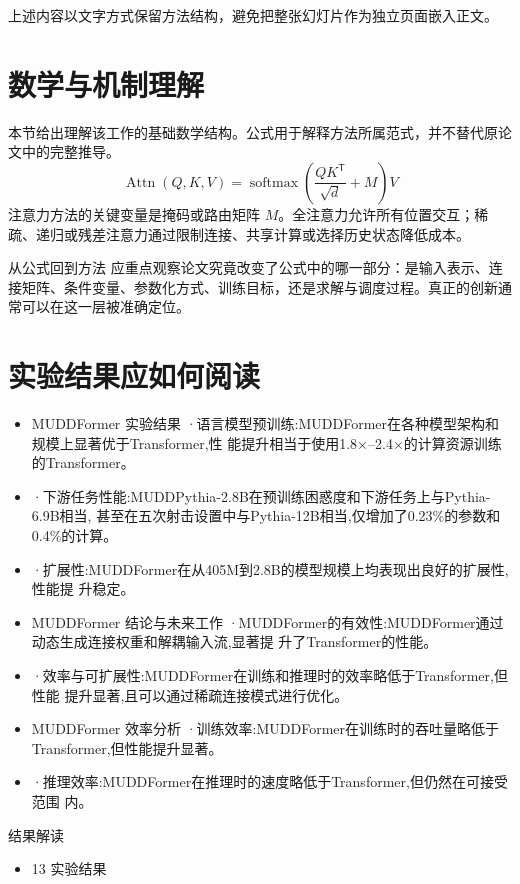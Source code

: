 \documentclass[UTF8,11pt,a4paper]{ctexart}
\begin{document}
上述内容以文字方式保留方法结构，避免把整张幻灯片作为独立页面嵌入正文。

\section{数学与机制理解}
本节给出理解该工作的基础数学结构。公式用于解释方法所属范式，并不替代原论文中的完整推导。
\begin{equation}
\operatorname{Attn}(Q,K,V)=\operatorname{softmax}\!\left(\frac{QK^{\mathsf T}}{\sqrt d}+M\right)V
\end{equation}
注意力方法的关键变量是掩码或路由矩阵 $M$。全注意力允许所有位置交互；稀疏、递归或残差注意力通过限制连接、共享计算或选择历史状态降低成本。

\begin{keybox}{从公式回到方法}
应重点观察论文究竟改变了公式中的哪一部分：是输入表示、连接矩阵、条件变量、参数化方式、训练目标，还是求解与调度过程。真正的创新通常可以在这一层被准确定位。
\end{keybox}


\section{实验结果应如何阅读}
\begin{itemize}
\item MUDDFormer 实验结果 ·语言模型预训练:MUDDFormer在各种模型架构和规模上显著优于Transformer,性 能提升相当于使用1.8×–2.4×的计算资源训练的Transformer。
\item ·下游任务性能:MUDDPythia-2.8B在预训练困惑度和下游任务上与Pythia-6.9B相当, 甚至在五次射击设置中与Pythia-12B相当,仅增加了0.23\%的参数和0.4\%的计算。
\item ·扩展性:MUDDFormer在从405M到2.8B的模型规模上均表现出良好的扩展性,性能提 升稳定。
\item MUDDFormer 结论与未来工作 ·MUDDFormer的有效性:MUDDFormer通过动态生成连接权重和解耦输入流,显著提 升了Transformer的性能。
\item ·效率与可扩展性:MUDDFormer在训练和推理时的效率略低于Transformer,但性能 提升显著,且可以通过稀疏连接模式进行优化。
\item MUDDFormer 效率分析 ·训练效率:MUDDFormer在训练时的吞吐量略低于Transformer,但性能提升显著。
\item ·推理效率:MUDDFormer在推理时的速度略低于Transformer,但仍然在可接受范围 内。
\end{itemize}

\begin{notebox}{结果解读}
\begin{itemize}
\item 13 实验结果
\end{itemize}
\end{notebox}
\end{document}
